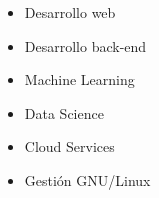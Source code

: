 
\vspace{-0.5cm}
\begin{multicols}{4}
\begin{itemize}
    \renewcommand\labelitemi{\checkmark}
    \setlength\itemsep{0pt}
    \setlength\parskip{0pt}
    \item Desarrollo web
    \item Desarrollo back-end
    \item Machine Learning
    \item Data Science
    \item Cloud Services
    \item Gestión GNU/Linux
\end{itemize}
\end{multicols}
    
